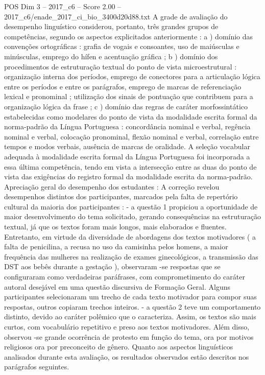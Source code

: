 \begin{textsample}{POS Dim 3 – 2017\_c6 – Score 2.00 – 2017\_c6/enade\_2017\_ci\_bio\_3400d20d88.txt}
A grade de avaliação do desempenho linguístico considerou, portanto, três grandes grupos de competências, segundo os aspectos explicitados anteriormente : a ) domínio das convenções ortográficas : grafia de vogais e consoantes, uso de maiúsculas e minúsculas, emprego do hífen e acentuação gráfica ; b ) domínio dos procedimentos de estruturação textual do ponto de vista microestrutural : organização interna dos períodos, emprego de conectores para a articulação lógica entre os períodos e entre os parágrafos, emprego de marcas de referenciação lexical e pronominal ; utilização dos sinais de pontuação que contribuem para a organização lógica da frase ; c ) domínio das regras de caráter morfossintático estabelecidas como modelares do ponto de vista da modalidade escrita formal da norma-padrão da Língua Portuguesa : concordância nominal e verbal, regência nominal e verbal, colocação pronominal, flexão nominal e verbal, correlação entre tempos e modos verbais, ausência de marcas de oralidade.
A seleção vocabular adequada à modalidade escrita formal da Língua Portuguesa foi incorporada a essa última competência, tendo em vista a intersecção entre as duas do ponto de vista das exigências do registro formal da modalidade escrita da norma-padrão.
Apreciação geral do desempenho dos estudantes : A correção revelou desempenhos distintos dos participantes, marcados pela falta de repertório cultural da maioria dos participantes : - a questão 1 propiciou a oportunidade de maior desenvolvimento do tema solicitado, gerando consequências na estruturação textual, já que os textos foram mais longos, mais elaborados e fluentes.
Entretanto, em virtude da diversidade de abordagens dos textos motivadores ( a falta de penicilina, a recusa no uso da camisinha pelos homens, a maior frequência das mulheres na realização de exames ginecológicos, a transmissão das DST aos bebês durante a gestação ), observaram -se respostas que se configuraram como verdadeiras paráfrases, com comprometimento do caráter autoral desejável em uma questão discursiva de Formação Geral.
Alguns participantes selecionaram um trecho de cada texto motivador para compor suas respostas, outros copiaram trechos inteiros. - a questão 2 teve um comportamento distinto, devido ao caráter polêmico que o caracteriza.
Assim, os textos são mais curtos, com vocabulário repetitivo e preso aos textos motivadores.
Além disso, observou -se grande ocorrência de protesto em função do tema, ora por motivos religiosos ora por preconceito de gênero.
Quanto aos aspectos linguísticos analisados durante esta avaliação, os resultados observados estão descritos nos parágrafos seguintes.

\end{textsample}
